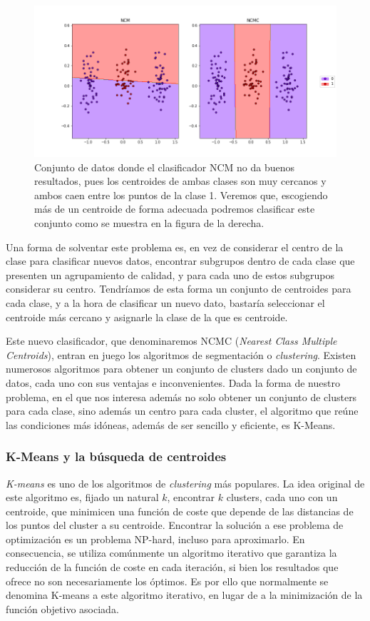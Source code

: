 \documentclass{book}
\begin{document}
\begin{figure}[h]
	\centering
	\includegraphics[width=1.0\textwidth]{images/ncm_problem.png}
	\caption{Conjunto de datos donde el clasificador NCM no da buenos resultados, pues los centroides de ambas clases son muy cercanos y ambos caen entre los puntos de la clase 1. Veremos que, escogiendo más de un centroide de forma adecuada podremos clasificar este conjunto como se muestra en la figura de la derecha.} \label{fig:problema_ncm}
\end{figure}

Una forma de solventar este problema es, en vez de considerar el centro de la clase para clasificar nuevos datos, encontrar subgrupos dentro de cada clase que presenten un agrupamiento de calidad, y para cada uno de estos subgrupos considerar su centro. Tendríamos de esta forma un conjunto de centroides para cada clase, y a la hora de clasificar un nuevo dato, bastaría seleccionar el centroide más cercano y asignarle la clase de la que es centroide.

Este nuevo clasificador, que denominaremos NCMC (\emph{Nearest Class Multiple Centroids}), entran en juego los algoritmos de segmentación o \emph{clustering}. Existen numerosos algoritmos \cite{clustering_algorithms} para obtener un conjunto de clusters dado un conjunto de datos, cada uno con sus ventajas e inconvenientes. Dada la forma de nuestro problema, en el que nos interesa además no solo obtener un conjunto de clusters para cada clase, sino además un centro para cada cluster, el algoritmo que reúne las condiciones más idóneas, además de ser sencillo y eficiente, es K-Means.

\subsubsection{K-Means y la búsqueda de centroides}

\emph{K-means} es uno de los algoritmos de \emph{clustering} más populares. La idea original de este algoritmo es, fijado un natural $k$, encontrar $k$ clusters, cada uno con un centroide, que minimicen una función de coste que depende de las distancias de los puntos del cluster a su centroide. Encontrar la solución a ese problema de optimización es un problema NP-hard, incluso para aproximarlo. En consecuencia, se utiliza comúnmente un algoritmo iterativo que garantiza la reducción de la función de coste en cada iteración, si bien los resultados que ofrece no son necesariamente los óptimos. Es por ello que normalmente se denomina K-means a este algoritmo iterativo, en lugar de a la minimización de la función objetivo asociada.
\end{document}
